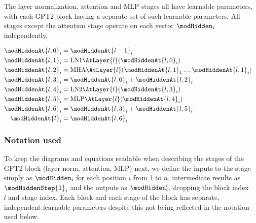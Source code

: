 The layer normalization, attention and MLP stages all have learnable parameters, with each GPT2 block having a separate set of such learnable parameters. All stages except the attention stage operate on each vector $\modHidden_i$ independently.


\begin{align}
	\modHiddenAt{l, 0}_i &= \modHiddenAt{l-1}_i
	\label{eq:gpt2_overview_start}
	\\
	\modHiddenAt{l, 1}_i &= \mathrm{LN1}\AtLayer{l}(\modHiddenAt{l, 0}_i)
	\label{eq:gpt2_overview_ln1}
	\\
	\modHiddenAt{l, 2}_i &= \mathrm{MHA}\AtLayer{l}(\modHiddenAt{l, 1}_1 \ldots \modHiddenAt{l, 1}_i)
	\label{eq:gpt2_overview_attn}
	\\
	\modHiddenAt{l, 3}_i &= \modHiddenAt{l, 0}_i + \modHiddenAt{l, 2}_i
	\label{eq:gpt2_overview_res1}
	\\
	\modHiddenAt{l, 4}_i &= \mathrm{LN2}\AtLayer{l}(\modHiddenAt{l, 3}_i)
	\label{eq:gpt2_overview_ln2}
	\\
	\modHiddenAt{l, 5}_i &= \mathrm{MLP}\AtLayer{l}(\modHiddenAt{l, 4}_i)
	\label{eq:gpt2_overview_mlp}
	\\
	\modHiddenAt{l, 6}_i &= \modHiddenAt{l, 3}_i + \modHiddenAt{l, 5}_i
	\label{eq:gpt2_overview_res2}
	\\
	\modHiddenAt{l}_i &= \modHiddenAt{l, 6}_i
	\label{eq:gpt2_overview_end}
\end{align}




\subsubsection{Notation used}
\label{gpt2:notation}

To keep the diagrams and equations readable when describing the stages of the GPT2 block (layer norm, attention, MLP) next, we define the inputs to the stage simply as $\modHidden_i$ for each position $i$ from 1 to $n$, intermediate results as $\modHiddenStep{1}_i$ and the outputs as $\modHidden'_i$, dropping the block index $l$ and stage index.
Each block and each stage of the block has separate, independent learnable parameters despite this not being reflected in the notation used below.

